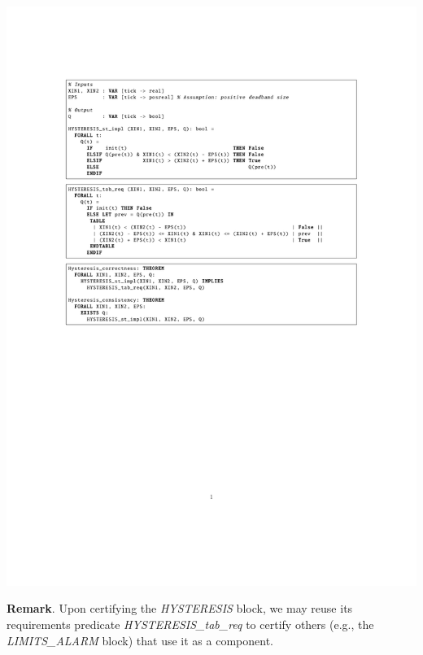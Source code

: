 \documentclass[a0,landscape]{a0poster}
\def\graphspacing{\vspace{.5cm}}
\newcommand{\var}[1]{{\small \textit{#1}}}
\begin{document}
\begin{multicols}{4}
\begin{center}\graphspacing
\includegraphics[width=\linewidth]{figures/hysteresis/hysteresis_pvs_theorems}
\end{center}\graphspacing

\noindent \textbf{Remark}. Upon certifying the \var{HYSTERESIS} block, we may reuse its requirements predicate \var{HYSTERESIS\_tab\_req} to certify others (e.g., the \var{LIMITS\_ALARM} block) that use it as a component. 



\end{multicols}
\end{document}
